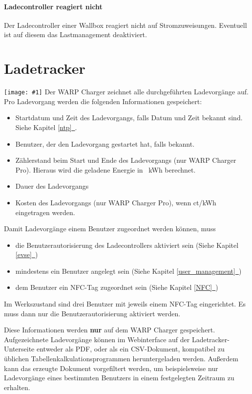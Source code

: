 \documentclass[a4paper,10pt]{article}
\newcommand{\hint}[1]{\begin{tcolorbox}[colback=boxgray,colframe=black,coltext=
white,title=Hinweis,left*=2mm,right*=2mm,boxsep=1mm,bottom=1mm,top=1mm]#1\end{tcolorbox}}
\newcommand{\gfx}[1]{\texttt{[image: \#1]}}
\newcommand*{\fullref}[1]{\hyperref[{#1}]{\ref*{#1}~\nameref*{#1}}}
\begin{document}
\begin{multicols*}{2}
	\paragraph{Ladecontroller reagiert nicht}
	Der Ladecontroller einer Wallbox reagiert nicht auf Stromzuweisungen. Eventuell ist auf diesem das Lastmanagement deaktiviert.

	\newpage
	\section{Ladetracker}\label{charge_tracker}
	\gfx{./img_warp2/resized/web_charge_tracker}
	Der WARP Charger zeichnet alle durchgeführten Ladevorgänge auf. Pro Ladevorgang werden die folgenden Informationen gespeichert:
	\begin{itemize}
	 \item Startdatum und Zeit des Ladevorgangs, falls Datum und Zeit bekannt
	 sind. Siehe Kapitel \fullref{ntp}.
	 \item Benutzer, der den Ladevorgang gestartet hat, falls bekannt.
	 \item Zählerstand beim Start und Ende des Ladevorgangs (nur WARP Charger Pro). Hieraus wird die geladene Energie in \SI{}{\kWh} berechnet.
	 \item Dauer des Ladevorgangs
	 \item Kosten des Ladevorgangs (nur WARP Charger Pro), wenn ct/kWh eingetragen werden.
	\end{itemize}

	\vfill
	\null
	\columnbreak

	\hint{Damit Ladevorgänge einem Benutzer zugeordnet werden können, muss
		\begin{itemize}
			\item die Benutzerautorisierung des Ladecontrollers aktiviert sein
			(Siehe Kapitel \fullref{evse})
			\item mindestens ein Benutzer angelegt sein (Siehe Kapitel \fullref{user_management})
			\item dem Benutzer ein NFC-Tag zugeordnet sein (Siehe Kapitel \fullref{NFC})
		\end{itemize}
		Im Werkszustand sind drei Benutzer mit jeweils einem NFC-Tag eingerichtet. Es muss dann nur die Benutzerautorisierung aktiviert werden.
	}

	Diese Informationen werden \textbf{nur} auf dem WARP Charger gespeichert.
	Aufgezeichnete Ladevorgänge können im Webinterface auf der Ladetracker-Unterseite entweder als PDF, oder als ein CSV-Dokument,
	kompatibel zu üblichen Tabellenkalkulationsprogrammen heruntergeladen werden. Außerdem kann das erzeugte Dokument
	vorgefiltert werden, um beispielsweise nur Ladevorgänge eines bestimmten Benutzers in einem festgelegten Zeitraum zu erhalten.


\end{multicols*}
\end{document}
